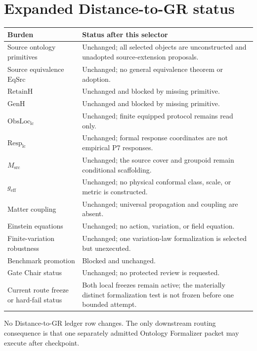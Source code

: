 \documentclass[11pt]{article}
\begin{document}
\section{Expanded Distance-to-GR status}

\begin{longtable}{>{\raggedright\arraybackslash}p{}
                  >{\raggedright\arraybackslash}p{}}
\toprule
Burden & Status after this selector\\
\midrule
\endhead
Source ontology primitives & Unchanged; all selected objects are unconstructed
and unadopted source-extension proposals.\\
Source equivalence $\mathrm{EqSrc}$ & Unchanged; no general equivalence theorem
or adoption.\\
$\mathrm{RetainH}$ & Unchanged and blocked by missing primitive.\\
$\mathrm{GenH}$ & Unchanged and blocked by missing primitive.\\
$\mathrm{ObsLoc}_{\mathrm{lc}}$ & Unchanged; finite equipped protocol remains
read only.\\
$\mathrm{Resp}_{\mathrm{lc}}$ & Unchanged; formal response coordinates are not
empirical P7 responses.\\
$M_{\mathrm{src}}$ & Unchanged; the source cover and groupoid remain conditional
scaffolding.\\
$g_{\mathrm{eff}}$ & Unchanged; no physical conformal class, scale, or metric is
constructed.\\
Matter coupling & Unchanged; universal propagation and coupling are absent.\\
Einstein equations & Unchanged; no action, variation, or field equation.\\
Finite-variation robustness & Unchanged; one variation-law formalization is
selected but unexecuted.\\
Benchmark promotion & Blocked and unchanged.\\
Gate Chair status & Unchanged; no protected review is requested.\\
Current route freeze or hard-fail status & Both local freezes remain active;
the materially distinct formalization test is not frozen before one bounded
attempt.\\
\bottomrule
\end{longtable}

No Distance-to-GR ledger row changes.  The only downstream routing consequence
is that one separately admitted Ontology Formalizer packet may execute after
checkpoint.
\end{document}

